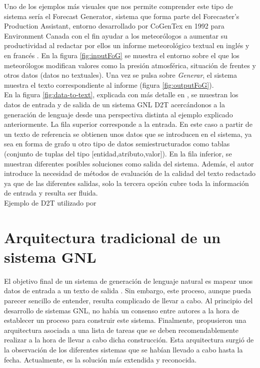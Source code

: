 Uno de los ejemplos más visuales que nos permite comprender este tipo de sistema sería el Forecast Generator, sistema que forma parte del Forecaster's Production Assistant, entorno desarrollado por CoGenTex en 1992 para Environment Canada con el fin ayudar a los meteorólogos a aumentar su productividad al redactar por ellos un informe meteorológico textual en inglés y en francés \citep{goldberg1994using}. En la figura  \ref{fig:inputFoG} se muestra el entorno sobre el que los meteorólogos modifican valores como la presión atmosférica, situación de frentes y otros datos (datos no textuales). Una vez se pulsa sobre \textit{Generar}, el sistema muestra el texto correspondiente al informe (figura \ref{fig:outputFoG}). \\


En la figura \ref{fig:data-to-text}, explicada con más detalle en \cite{sai2020survey}, se muestran los datos de entrada y de salida de un sistema GNL D2T acercándonos a la generación de lenguaje desde una perspectiva distinta al ejemplo explicado anteriormente. La fila superior corresponde a la entrada. En este caso a partir de un texto de referencia se obtienen unos datos que se introducen en el sistema, ya sea en forma de grafo u otro tipo de datos semiestructurados como tablas (conjunto de tuplas del tipo [entidad,atributo,valor]). En la fila inferior, se muestran diferentes posibles soluciones como salida del sistema. Además, el autor introduce la necesidad de métodos de evaluación de la calidad del texto redactado ya que de las diferentes salidas, solo la tercera opción cubre toda la información de entrada y resulta ser fluida.\\

%
{Ejemplo de D2T utilizado por \cite{sai2020survey}}

\section{Arquitectura tradicional de un sistema GNL}
\label{sec:arquitectura_tradicional}
El objetivo final de un sistema de generación de lenguaje natural es mapear unos datos de entrada a un texto de salida \citep{reiter1997building}. Sin embargo, este proceso, aunque pueda parecer sencillo de entender, resulta complicado de llevar a cabo. Al principio del desarrollo de sistemas GNL, no había un consenso entre autores a la hora de establecer un proceso para construir este sistema. Finalmente, \cite{reiter1997building} propusieron una arquitectura asociada a una lista de tareas que se deben recomendablemente realizar a la hora de llevar a cabo dicha construcción. Esta arquitectura surgió de la observación de los diferentes sistemas que se habían llevado a cabo hasta la fecha.  Actualmente, es la solución más extendida y reconocida.\\

